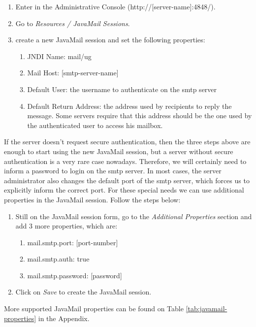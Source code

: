 \documentclass[envcountsame,envcountchap]{svmono}
\begin{document}
\begin{enumerate}
\item Enter in the Administrative Console (http://[server-name]:4848/).
\item Go to \textit{Resources / JavaMail Sessions}.
\item create a new JavaMail session and set the following properties:
   \begin{enumerate}
   \item JNDI Name: mail/ug
   \item Mail Host: [smtp-server-name]
   \item Default User: the username to authenticate on the smtp
    server
   \item Default Return Address: the address used by recipients to
    reply the message. Some servers require that this address
    should be the one used by the authenticated user to access his
    mailbox.
   \end{enumerate}
\end{enumerate}
 
If the server doesn't request secure authentication, then the three steps above are enough to start using the new JavaMail session, but a server without secure authentication is a very rare case nowadays. Therefore, we will certainly need to inform a password to login on the smtp server. In most cases, the server administrator also changes the default port of the smtp server, which forces us to explicitly inform the correct port. For these special needs we can use additional properties in the JavaMail session. Follow the steps below:

\begin{enumerate}
\item Still on the JavaMail session form, go to the \textit{Additional Properties} section and add 3 more properties, which are:
   \begin{enumerate}
   \item mail.smtp.port: [port-number]
   \item mail.smtp.auth: true
   \item mail.smtp.password: [password]
   \end{enumerate}
\item Click on \textit{Save} to create the JavaMail session.
\end{enumerate}

More supported JavaMail properties can be found on Table \ref{tab:javamail-properties} in the Appendix.
\end{document}
